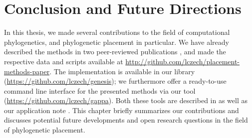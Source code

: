 
\chapter{Conclusion and Future Directions}
\label{ch:ConclusionFutureDirections}







In this thesis, we made several contributions to the field of computational phylogenetics,
and phylogenetic placement in particular.
We have already described the methods in two peer-reviewed publications \cite{Czech2018-phat,Czech2019-analysis},
and made the respective data and scripts available at \url{http://github.com/lczech/placement-methods-paper}.
The implementation is available in our  library (\url{https://github.com/lczech/genesis});
we furthermore offer a ready-to-use command line interface for the presented methods
via our  tool (\url{https://github.com/lczech/gappa}).
Both these tools are described in 
as well as our application note \cite{Czech2019-genesis-gappa}.
This chapter briefly summarizes our contributions and discusses potential future developments
and open research questions in the field of phylogenetic placement.

